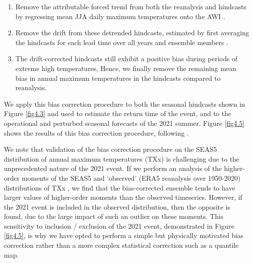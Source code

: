     \begin{enumerate}
      \item Remove the attributable forced trend from both the reanalysis and hindcasts by regressing mean JJA daily maximum temperatures onto the AWI \cite{hasselmann_optimal_1993}. 
      \item Remove the drift from these detrended hindcasts, estimated by first averaging the hindcasts for each lead time over all years and ensemble members   \cite{stockdale_coupled_1997}. 
      \item The drift-corrected hindcasts still exhibit a positive bias during periods of extreme high temperatures,  Hence, we finally remove the remaining mean bias in annual maximum temperatures in the hindcasts compared to reanalysis.
    \end{enumerate}
  
    We apply this bias correction procedure to both the seasonal hindcasts shown in Figure \ref{fig4.3} and used to estimate the return time of the event, and to the operational and perturbed seasonal forecasts of the 2021 summer. Figure \ref{fig4.5} shows the results of this bias correction procedure, following \citet{thompson_high_2017}.
  
    We note that validation of the bias correction procedure on the SEAS5 distribution of annual maximum temperatures (TXx) is challenging due to the unprecedented nature of the 2021 event. If we perform an analysis of the higher-order moments of the SEAS5 and `observed' (ERA5 reanalysis over 1950-2020) distributions of TXx \cite{thompson_high_2017}, we find that the bias-corrected ensemble tends to have larger values of higher-order moments than the observed timeseries. However, if the 2021 event is included in the observed distribution, then the opposite is found, due to the large impact of such an outlier on these moments. This sensitivity to inclusion / exclusion of the 2021 event, demonstrated in Figure \ref{fig4.5}, is why we have opted to perform a simple but physically motivated bias correction rather than a more complex statistical correction such as a quantile map.

